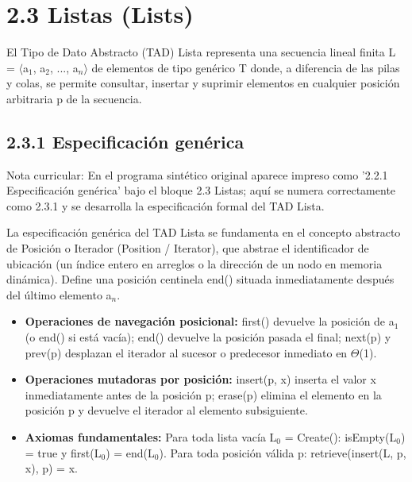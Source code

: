 \documentclass[11pt,letterpaper]{article}
\begin{document}
\section*{2.3 Listas (Lists)}
El Tipo de Dato Abstracto (TAD) Lista representa una secuencia lineal finita L = $\langle$a$_1$, a$_2$, ..., a$_n$$\rangle$ de elementos de tipo genérico T donde, a diferencia de las pilas y colas, se permite consultar, insertar y suprimir elementos en cualquier posición arbitraria p de la secuencia.\par
\subsection*{2.3.1 Especificación genérica}
Nota curricular: En el programa sintético original aparece impreso como '2.2.1 Especificación genérica' bajo el bloque 2.3 Listas; aquí se numera correctamente como 2.3.1 y se desarrolla la especificación formal del TAD Lista.\par
La especificación genérica del TAD Lista se fundamenta en el concepto abstracto de Posición o Iterador (Position / Iterator), que abstrae el identificador de ubicación (un índice entero en arreglos o la dirección de un nodo en memoria dinámica). Define una posición centinela end() situada inmediatamente después del último elemento a$_n$.\par
\begin{itemize}
\setlength{\itemsep}{2pt}\setlength{\parskip}{0pt}
  \item \textbf{Operaciones de navegación posicional: }first() devuelve la posición de a$_1$ (o end() si está vacía); end() devuelve la posición pasada el final; next(p) y prev(p) desplazan el iterador al sucesor o predecesor inmediato en $\Theta$(1).
  \item \textbf{Operaciones mutadoras por posición: }insert(p, x) inserta el valor x inmediatamente antes de la posición p; erase(p) elimina el elemento en la posición p y devuelve el iterador al elemento subsiguiente.
  \item \textbf{Axiomas fundamentales: }Para toda lista vacía L$_0$ = Create(): isEmpty(L$_0$) = true y first(L$_0$) = end(L$_0$). Para toda posición válida p: retrieve(insert(L, p, x), p) = x.
\end{itemize}
\end{document}
